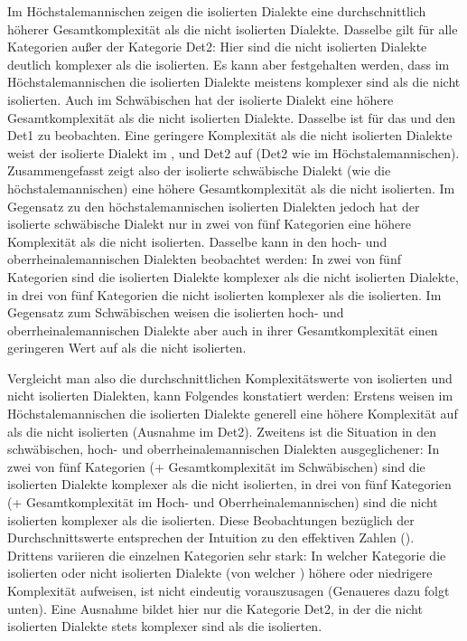 Im Höchstalemannischen zeigen die isolierten Dialekte eine durchschnittlich höherer Gesamtkomplexität als die nicht isolierten Dialekte. Dasselbe gilt für alle Kategorien außer der Kategorie Det2: Hier sind die nicht isolierten Dialekte deutlich komplexer als die isolierten. Es kann aber festgehalten werden, dass im Höchstalemannischen die isolierten Dialekte meistens komplexer sind als die nicht isolierten. Auch im Schwäbischen hat der isolierte Dialekt eine höhere Gesamtkomplexität als die nicht isolierten Dialekte. Dasselbe ist für das  und den Det1 zu beobachten. Eine geringere Komplexität als die nicht isolierten Dialekte weist der isolierte Dialekt im ,  und Det2 auf (Det2 wie im Höchstalemannischen). Zusammengefasst zeigt also der isolierte schwäbische Dialekt (wie die höchstalemannischen) eine höhere Gesamtkomplexität als die nicht isolierten. Im Gegensatz zu den höchstalemannischen isolierten Dialekten jedoch hat der isolierte schwäbische Dialekt nur in zwei von fünf Kategorien eine höhere Komplexität als die nicht isolierten. Dasselbe kann in den hoch- und oberrheinalemannischen Dialekten beobachtet werden: In zwei von fünf Kategorien sind die isolierten Dialekte komplexer als die nicht isolierten Dialekte, in drei von fünf Kategorien die nicht isolierten komplexer als die isolierten. Im Gegensatz zum Schwäbischen weisen die isolierten hoch- und oberrheinalemannischen Dialekte aber auch in ihrer Gesamtkomplexität einen geringeren Wert auf als die nicht isolierten.

Vergleicht man also die durchschnittlichen Komplexitätswerte von isolierten und nicht isolierten Dialekten, kann Folgendes konstatiert werden: Erstens weisen im Höchstalemannischen die isolierten Dialekte generell eine höhere Komplexität auf als die nicht isolierten (Ausnahme im Det2). Zweitens ist die Situation in den schwäbischen, hoch- und oberrheinalemannischen Dialekten ausgeglichener: In zwei von fünf Kategorien (+ Gesamtkomplexität im Schwäbischen) sind die isolierten Dialekte komplexer als die nicht isolierten, in drei von fünf Kategorien (+ Gesamtkomplexität im Hoch- und Oberrheinalemannischen) sind die nicht isolierten komplexer als die isolierten. Diese Beobachtungen bezüglich der Durchschnittswerte entsprechen der Intuition zu den effektiven Zahlen (). Drittens variieren die einzelnen Kategorien sehr stark: In welcher Kategorie die isolierten oder nicht isolierten Dialekte (von welcher ) höhere oder niedrigere Komplexität aufweisen, ist nicht eindeutig vorauszusagen (Genaueres dazu folgt unten). Eine Ausnahme bildet hier nur die Kategorie Det2, in der die nicht isolierten Dialekte stets komplexer sind als die isolierten.

